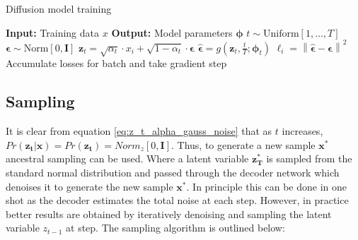 \documentclass[11pt]{article}
\begin{document}
\begin{algorithm}[H]
    \caption{Diffusion model training}
    \begin{algorithmic}[1]
    \State \textbf{Input:} Training data $x$
    \State \textbf{Output:} Model parameters $\boldsymbol{\phi}$
     
         
            \State $t \sim \text{Uniform}[1, \ldots, T]$ 
            \State $\boldsymbol{\epsilon} \sim \text{Norm}[0, \mathbf{I}]$ 
            \State $\boldsymbol{z}_{t} = \sqrt{\alpha_t} \cdot x_i + \sqrt{1 - \alpha_t} \cdot \boldsymbol{\epsilon}$ 
            \State $\hat{\boldsymbol{\epsilon}} = g \left( \boldsymbol{z}_{t}, \frac{t}{T}; \boldsymbol{\phi}_t \right)$ 
            \State $\ell_i = \left\|\hat{\boldsymbol{\epsilon}} - \boldsymbol{\epsilon} \right\|^2$ 
        \EndFor
        \State Accumulate losses for batch and take gradient step
    \EndWhile
    \end{algorithmic}
\end{algorithm}
\subsection{Sampling}
It is clear from equation \ref{eq:z_t_alpha_gauss_noise} that as $t$ increases, $Pr(\mathbf{z_t}|\mathbf{x})=Pr(\mathbf{z_t})=Norm_z[0,\mathbf{I}]$. Thus, to generate a new sample $\mathbf{x^*}$ ancestral sampling can be used. Where a latent variable $\mathbf{z_T^*}$ is sampled from the standard normal distribution and passed through the decoder network which denoises it to generate the new sample $\mathbf{x^*}$. In principle this can be done in one shot as the decoder estimates the total noise at each step. However, in practice better results are obtained by iteratively denoising and sampling the latent variable $z_{t-1}$ at step. The sampling algorithm is outlined below:
\end{document}

